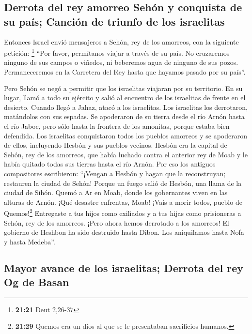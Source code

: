 \hypertarget{derrota-del-rey-amorreo-sehuxf3n-y-conquista-de-su-pauxeds-canciuxf3n-de-triunfo-de-los-israelitas}{%
\subsection{Derrota del rey amorreo Sehón y conquista de su país;
Canción de triunfo de los
israelitas}\label{derrota-del-rey-amorreo-sehuxf3n-y-conquista-de-su-pauxeds-canciuxf3n-de-triunfo-de-los-israelitas}}

 Entonces Israel envió mensajeros a Sehón, rey de los
amorreos, con la siguiente petición: \footnote{\textbf{21:21} Deut
  2,26-37}  ``Por favor, permítanos viajar a través de su
país. No cruzaremos ninguno de sus campos o viñedos, ni beberemos agua
de ninguno de sus pozos. Permaneceremos en la Carretera del Rey hasta
que hayamos pasado por su país''.

 Pero Sehón se negó a permitir que los israelitas
viajaran por su territorio. En su lugar, llamó a todo su ejército y
salió al encuentro de los israelitas de frente en el desierto. Cuando
llegó a Jahaz, atacó a los israelitas.  Los israelitas
los derrotaron, matándolos con sus espadas. Se apoderaron de su tierra
desde el río Arnón hasta el río Jaboc, pero sólo hasta la frontera de
los amonitas, porque estaba bien defendida.  Los
israelitas conquistaron todos los pueblos amorreos y se apoderaron de
ellos, incluyendo Hesbón y sus pueblos vecinos.  Hesbón
era la capital de Sehón, rey de los amorreos, que había luchado contra
el anterior rey de Moab y le había quitado todas sus tierras hasta el
río Arnón.  Por eso los antiguos compositores
escribieron: ``¡Vengan a Hesbón y hagan que la reconstruyan; restauren
la ciudad de Sehón!  Porque un fuego salió de Hesbón, una
llama de la ciudad de Sihón. Quemó a Ar en Moab, donde los gobernantes
viven en las alturas de Arnón.  ¡Qué desastre enfrentas,
Moab! ¡Vais a morir todos, pueblo de Quemos!\footnote{\textbf{21:29}
  Quemos era un dios al que se le presentaban sacrificios humanos.}
Entregaste a tus hijos como exiliados y a tus hijas como prisioneras a
Sehón, rey de los amorreos.  ¡Pero ahora hemos derrotado
a los amorreos! El gobierno de Heshbon ha sido destruido hasta Dibon.
Los aniquilamos hasta Nofa y hasta Medeba''.

\hypertarget{mayor-avance-de-los-israelitas-derrota-del-rey-og-de-basan}{%
\subsection{Mayor avance de los israelitas; Derrota del rey Og de
Basan}\label{mayor-avance-de-los-israelitas-derrota-del-rey-og-de-basan}}

